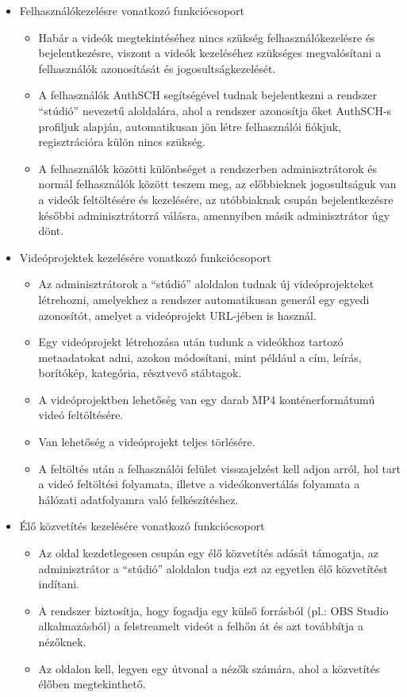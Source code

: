 \begin{itemize}
  \item Felhasználókezelésre vonatkozó funkciócsoport
        \begin{itemize}
          \item Habár a videók megtekintéséhez nincs szükség felhasználókezelésre és bejelentkezésre, viszont a videók kezeléséhez szükséges megvalósítani a felhasználók azonosítását és jogosultságkezelését.
          \item A felhasználók AuthSCH segítségével tudnak bejelentkezni a rendszer ``stúdió'' nevezetű aloldalára, ahol a rendszer azonosítja őket AuthSCH-s profiljuk alapján, automatikusan jön létre felhasználói fiókjuk, regisztrációra külön nincs szükség.
          \item A felhasználók közötti különbséget a rendszerben adminisztrátorok és normál felhasználók között teszem meg, az előbbieknek jogosultságuk van a videók feltöltésére és kezelésére, az utóbbiaknak csupán bejelentkezésre későbbi adminisztrátorrá válásra, amennyiben másik adminisztrátor úgy dönt.
        \end{itemize}

  \item Videóprojektek kezelésére vonatkozó funkciócsoport
        \begin{itemize}
          \item Az adminisztrátorok a ``stúdió'' aloldalon tudnak új videóprojekteket létrehozni, amelyekhez a rendszer automatikusan generál egy egyedi azonosítót, amelyet a videóprojekt URL-jében is használ.
          \item Egy videóprojekt létrehozása után tudunk a videókhoz tartozó metaadatokat adni, azokon módosítani, mint például a cím, leírás, borítókép, kategória, résztvevő stábtagok.
          \item A videóprojektben lehetőség van egy darab MP4 konténerformátumú videó feltöltésére.
          \item Van lehetőség a videóprojekt teljes törlésére.
          \item A feltöltés után a felhasználói felület visszajelzést kell adjon arról, hol tart a videó feltöltési folyamata, illetve a videókonvertálás folyamata a hálózati adatfolyamra való felkészítéshez.
        \end{itemize}

  \item Élő közvetítés kezelésére vonatkozó funkciócsoport
        \begin{itemize}
          \item Az oldal kezdetlegesen csupán egy élő közvetítés adását támogatja, az adminisztrátor a ``stúdió'' aloldalon tudja ezt az egyetlen élő közvetítést indítani.
          \item A rendszer biztosítja, hogy fogadja egy külső forrásból (pl.: OBS Studio alkalmazásból) a felstreamelt videót a felhőn át és azt továbbítja a nézőknek.
          \item Az oldalon kell, legyen egy útvonal a nézők számára, ahol a közvetítés élőben megtekinthető.
        \end{itemize}
\end{itemize}

